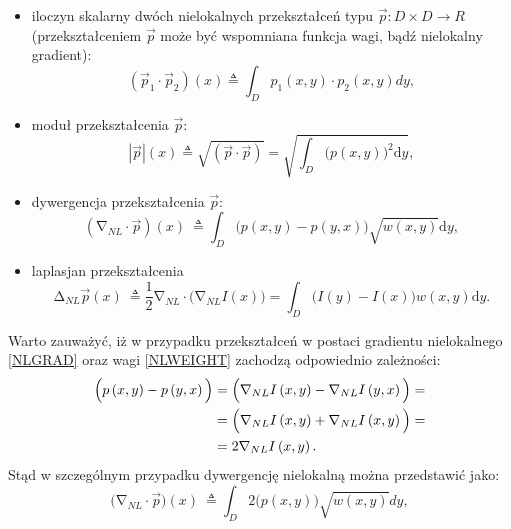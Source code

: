 \documentclass[12pt, twoside, openany]{report}
\theoremstyle{definition}
\begin{document}
\begin{itemize}
\item
iloczyn skalarny dwóch nielokalnych przekształceń typu $\overrightarrow{p}:D \times D \longrightarrow R$ (przekształceniem $\overrightarrow{p}$ może być wspomniana funkcja wagi, bądź nielokalny gradient):
\begin{equation}
\left({\overrightarrow{p}}_1\cdot {\overrightarrow{p}}_2\right)(x)\triangleq \int_D{p_1(x,y)\cdot p_2\left(x,y\right)dy}
\label{NLPRODUCT}
,
\end{equation}
\item
moduł przekształcenia $\overrightarrow{p}$:
\begin{equation}
\left|\overrightarrow{p}\right|\left(x\right)\triangleq \sqrt{(\overrightarrow{p}\cdot \overrightarrow{p})}=\sqrt{\int_D{{\big(p(x,y)\big)}^2\mathrm{d}y}}
\label{NLMOD}
,
\end{equation}
\item
dywergencja przekształcenia $\overrightarrow{p}$:
\begin{equation}
({\mathrm{\nabla }}_{NL}\cdot \overrightarrow{p})(x)\ \triangleq \int_D{\big(p\left(x,y\right)-p\left(y,x\right)\big)\sqrt{w(x,y)}\mathrm{d}y}
\label{NLDIV}
,
\end{equation}
\item
laplasjan przekształcenia
\begin{equation}
{\mathrm{\Delta }}_{NL}\overrightarrow{p}(x)\ \triangleq \frac{1}{2}{\mathrm{\nabla }}_{NL}\cdot \Big({\mathrm{\nabla }}_{NL}I\left(x\right)\Big)=\int_D{\Big(I\left(y\right)-I\left(x\right)\Big)w(x,y)\mathrm{d}y}
\label{NLLAP}
.
\end{equation}
\end{itemize}
Warto zauważyć, iż w przypadku przekształceń w postaci gradientu nielokalnego \eqref{NLGRAD} oraz wagi \eqref{NLWEIGHT} zachodzą odpowiednio zależności:
\begin{align}
\Big(p\left(x,y\right)-p\left(y,x\right)\Big) &= \Big({\mathrm{\nabla }}_{NL}I\left(x,y\right)-{\mathrm{\nabla }}_{NL}I\left(y,x\right)\Big)  \notag =\\ 
&= \Big({\mathrm{\nabla }}_{NL}I\left(x,y\right)+{\mathrm{\nabla }}_{NL}I\left(x,y\right)\Big) \notag =\\
&=2{\mathrm{\nabla }}_{NL}I\left(x,y\right) .
\label{NLPOM}
\end{align}
Stąd w szczególnym przypadku dywergencję nielokalną można przedstawić jako: 
\begin{equation}
\Big({\mathrm{\nabla }}_{NL}\cdot \overrightarrow{p}\Big)(x)\ \triangleq \int_D{2\Big(p\left(x,y\right)\Big)\sqrt{w(x,y)}dy}
\label{NLDIVSMART}
,
\end{equation}
\end{document}
